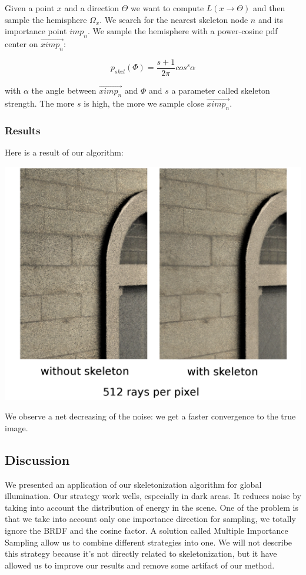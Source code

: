 Given a point $x$ and a direction $\Theta$ we want to compute $L(x \rightarrow \Theta)$ and then sample the hemisphere $\Omega_x$. We search for the nearest skeleton node $n$ and its importance point $imp_n$. We sample the hemisphere with a power-cosine pdf center on $\overrightarrow{ximp_n}$:

\begin{equation*}
p_{skel}(\Phi) = \frac{s + 1}{2\pi} cos^s \alpha
\end{equation*}

with $\alpha$ the angle between $\overrightarrow{ximp_n}$ and $\Phi$ and $s$ a parameter called skeleton strength. The more $s$ is high, the more we sample close $\overrightarrow{ximp_n}$.

\subsubsection{Results}

Here is a result of our algorithm:

\begin{center}
\includegraphics[scale=0.2]{images/skel_based_rt.png}
\end{center}

We observe a net decreasing of the noise: we get a faster convergence to the true image.

\subsection{Discussion}

We presented an application of our skeletonization algorithm for global illumination. Our strategy work wells, especially in dark areas. It reduces noise by taking into account the distribution of energy in the scene. One of the problem is that we take into account only one importance direction for sampling, we totally ignore the BRDF and the cosine factor. A solution called Multiple Importance Sampling allow us to combine different strategies into one. We will not describe this strategy because it's not directly related to skeletonization, but it have allowed us to improve our results and remove some artifact of our method.

